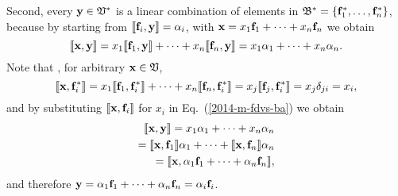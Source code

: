 Second,  every ${\bf y} \in {\frak V}^\ast $ is a linear combination of elements in
${\frak B}^\ast  = \{{\bf f}_1^\ast ,\ldots , {\bf f}_n^\ast \}$, because by
starting from
$\llbracket {\bf f}_i,  {\bf y}\rrbracket =\alpha_i$,
with
$ {\bf x} = x_1 {\bf f}_1 +\cdots + x_n {\bf f}_n$
we obtain
\begin{equation}
 \llbracket {\bf x},{\bf y}\rrbracket
= x_1 \llbracket {\bf f}_1,{\bf y}\rrbracket  +\cdots + x_n \llbracket {\bf f}_n,{\bf y}\rrbracket
= x_1 \alpha_1 +\cdots + x_n \alpha_n.
\label{2014-m-fdvs-ba}
\end{equation}
Note that , for arbitrary  ${\bf x}\in {\frak V}$,
\begin{equation}
 \llbracket {\bf x},{\bf f}_i^\ast \rrbracket
= x_1 \llbracket {\bf f}_1,{\bf f}_i^\ast \rrbracket  +\cdots + x_n \llbracket {\bf f}_n,{\bf f}_i^\ast \rrbracket =  x_j \llbracket {\bf f}_j,{\bf f}_i^\ast \rrbracket =  x_j \delta_{ji}=  x_i,
\label{2014-m-ch-fdlvs-kju}
\end{equation}
and by substituting $\llbracket {\bf x},{\bf f}_i\rrbracket $ for $x_i$ in Eq.~(\ref{2014-m-fdvs-ba}) we obtain
\begin{equation}
\begin{split}
 \llbracket {\bf x},{\bf y}\rrbracket  =
 x_1\alpha_1 +\cdots + x_n \alpha_n \\
= \llbracket {\bf x},{\bf f}_1\rrbracket  \alpha_1 +\cdots + \llbracket {\bf x},{\bf f}_n\rrbracket  \alpha_n  \\
= \llbracket {\bf x},\alpha_1 {\bf f}_1 +\cdots + \alpha_n{\bf f}_n\rrbracket  ,
\label{2014-m-fdvs-ba1}
\end{split}
\end{equation}
and therefore ${\bf y} =\alpha_1 {\bf f}_1 +\cdots + \alpha_n{\bf f}_n=\alpha_i{\bf f}_i$.


